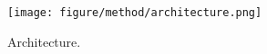 
\begin{figure}[]
    \centering
    \texttt{[image: figure/method/architecture.png]}
    \caption{Architecture.}
    \label{fig:architecture}
\end{figure}